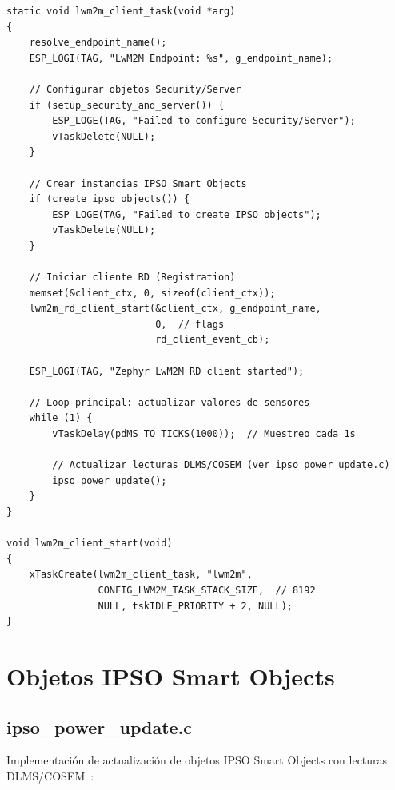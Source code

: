 \begin{verbatim}
static void lwm2m_client_task(void *arg)
{
    resolve_endpoint_name();
    ESP_LOGI(TAG, "LwM2M Endpoint: %s", g_endpoint_name);

    // Configurar objetos Security/Server
    if (setup_security_and_server()) {
        ESP_LOGE(TAG, "Failed to configure Security/Server");
        vTaskDelete(NULL);
    }

    // Crear instancias IPSO Smart Objects
    if (create_ipso_objects()) {
        ESP_LOGE(TAG, "Failed to create IPSO objects");
        vTaskDelete(NULL);
    }

    // Iniciar cliente RD (Registration)
    memset(&client_ctx, 0, sizeof(client_ctx));
    lwm2m_rd_client_start(&client_ctx, g_endpoint_name,
                          0,  // flags
                          rd_client_event_cb);

    ESP_LOGI(TAG, "Zephyr LwM2M RD client started");

    // Loop principal: actualizar valores de sensores
    while (1) {
        vTaskDelay(pdMS_TO_TICKS(1000));  // Muestreo cada 1s

        // Actualizar lecturas DLMS/COSEM (ver ipso_power_update.c)
        ipso_power_update();
    }
}

void lwm2m_client_start(void)
{
    xTaskCreate(lwm2m_client_task, "lwm2m",
                CONFIG_LWM2M_TASK_STACK_SIZE,  // 8192
                NULL, tskIDLE_PRIORITY + 2, NULL);
}
\end{verbatim}

\section{Objetos IPSO Smart Objects}

\subsection{ipso\_power\_update.c}

Implementación de actualización de objetos IPSO Smart Objects con lecturas DLMS/COSEM~\cite{dlmsLwM2MIntegration2024}:

